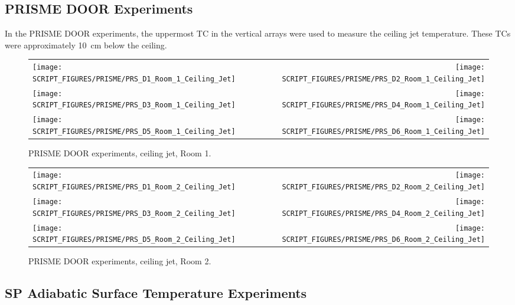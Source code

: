 \subsection{PRISME DOOR Experiments}

In the PRISME DOOR experiments, the uppermost TC in the vertical arrays were used to measure the ceiling jet temperature. These TCs were approximately 10~cm below the ceiling.

\begin{figure}[!h]
\begin{tabular*}{\textwidth}{l@{\extracolsep{\fill}}r}
\texttt{[image: SCRIPT\_FIGURES/PRISME/PRS\_D1\_Room\_1\_Ceiling\_Jet]} &
\texttt{[image: SCRIPT\_FIGURES/PRISME/PRS\_D2\_Room\_1\_Ceiling\_Jet]} \\
\texttt{[image: SCRIPT\_FIGURES/PRISME/PRS\_D3\_Room\_1\_Ceiling\_Jet]} &
\texttt{[image: SCRIPT\_FIGURES/PRISME/PRS\_D4\_Room\_1\_Ceiling\_Jet]} \\
\texttt{[image: SCRIPT\_FIGURES/PRISME/PRS\_D5\_Room\_1\_Ceiling\_Jet]} &
\texttt{[image: SCRIPT\_FIGURES/PRISME/PRS\_D6\_Room\_1\_Ceiling\_Jet]}
\end{tabular*}
\caption{PRISME DOOR experiments, ceiling jet, Room 1.}
\label{PRISME_Ceiling_Jet_Room_1}
\end{figure}

\newpage

\begin{figure}[p]
\begin{tabular*}{\textwidth}{l@{\extracolsep{\fill}}r}
\texttt{[image: SCRIPT\_FIGURES/PRISME/PRS\_D1\_Room\_2\_Ceiling\_Jet]} &
\texttt{[image: SCRIPT\_FIGURES/PRISME/PRS\_D2\_Room\_2\_Ceiling\_Jet]} \\
\texttt{[image: SCRIPT\_FIGURES/PRISME/PRS\_D3\_Room\_2\_Ceiling\_Jet]} &
\texttt{[image: SCRIPT\_FIGURES/PRISME/PRS\_D4\_Room\_2\_Ceiling\_Jet]} \\
\texttt{[image: SCRIPT\_FIGURES/PRISME/PRS\_D5\_Room\_2\_Ceiling\_Jet]} &
\texttt{[image: SCRIPT\_FIGURES/PRISME/PRS\_D6\_Room\_2\_Ceiling\_Jet]}
\end{tabular*}
\caption{PRISME DOOR experiments, ceiling jet, Room 2.}
\label{PRISME_Ceiling_Jet_Room_2}
\end{figure}


\clearpage

\subsection{SP Adiabatic Surface Temperature Experiments}

